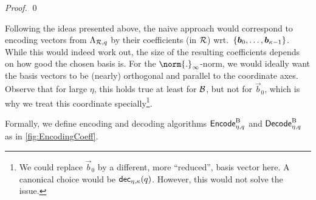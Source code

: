 \begin{proof}
\qed
\end{proof}

Following the ideas presented above, the naive approach would correspond to encoding vectors from $\Lambda_{\mathcal{R},q}$ by their coefficients (in $\mathcal{R}$) wrt.\ $\{\boldsymbol{b}_0,\ldots,\boldsymbol{b}_{\kappa-1}\}$.
While this would indeed work out, the size of the resulting coefficients depends on how good the chosen basis is.
For the $\norm{.}_\infty$-norm, we would ideally want the basis vectors to be (nearly) orthogonal and parallel to the coordinate axes.
Observe that for large $\eta$, this holds true at least for $\mathcal{B}$, but not for $\vec{b}_0$, which is why we treat this coordinate specially\footnote{We could replace $\vec{b}_0$ by a different, more ``reduced'', basis vector here. A canonical choice would be $\mathsf{dec}_{\eta,\kappa}(q)$. However, this would not solve the issue.}.
\fi

Formally, we define encoding and decoding algorithms $\mathsf{Encode}^{\textup{B}}_{\eta,q}$ and $\mathsf{Decode}^{\textup{B}}_{\eta,q}$ as in \autoref{fig:EncodingCoeff}.




